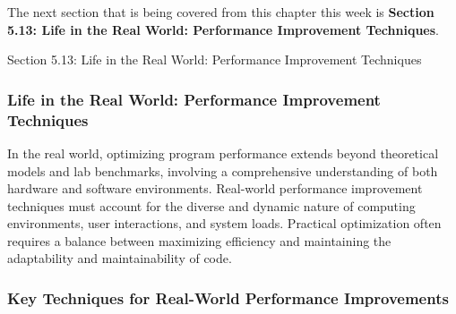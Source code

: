The next section that is being covered from this chapter this week is \textbf{Section 5.13: Life in the Real World: Performance Improvement Techniques}.

\begin{notes}{Section 5.13: Life in the Real World: Performance Improvement Techniques}
    \subsubsection*{Life in the Real World: Performance Improvement Techniques}

    In the real world, optimizing program performance extends beyond theoretical models and lab benchmarks, involving a comprehensive understanding of both hardware and software environments. Real-world 
    performance improvement techniques must account for the diverse and dynamic nature of computing environments, user interactions, and system loads. Practical optimization often requires a balance 
    between maximizing efficiency and maintaining the adaptability and maintainability of code. \vspace*{1em}
    
    \subsubsection*{Key Techniques for Real-World Performance Improvements}
    

\end{notes}
